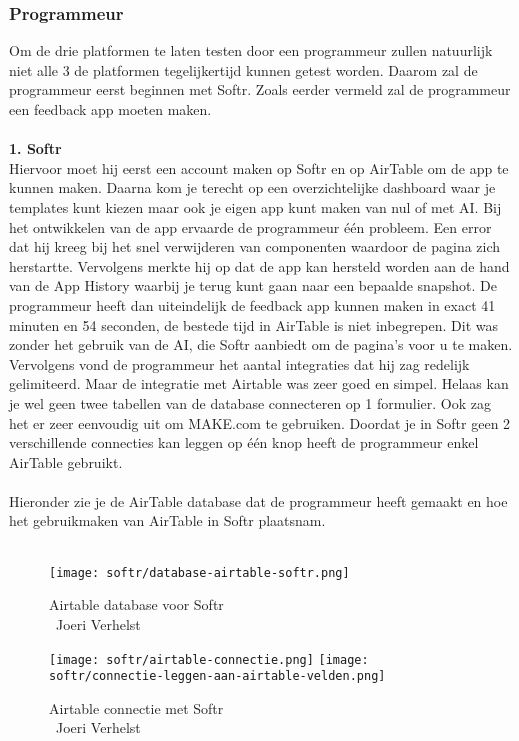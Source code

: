 \subsubsection{Programmeur}%
\label{subsubsec:programmeur}
Om de drie platformen te laten testen door een programmeur zullen natuurlijk niet alle 3 de platformen tegelijkertijd 
kunnen getest worden. Daarom zal de programmeur eerst beginnen met Softr. 
Zoals eerder vermeld zal de programmeur een feedback app moeten maken.
\\
\\
\textbf{1. Softr}
\\
Hiervoor moet hij eerst een account maken op Softr en op AirTable om de app te kunnen maken. 
Daarna kom je terecht op een overzichtelijke dashboard waar je templates kunt kiezen maar 
ook je eigen app kunt maken van nul of met AI. Bij het ontwikkelen van de app ervaarde de programmeur één probleem.
Een error dat hij kreeg bij het snel verwijderen van componenten waardoor de pagina zich herstartte. 
Vervolgens merkte hij op dat de app kan hersteld worden aan de hand van de App History waarbij je terug kunt gaan 
naar een bepaalde snapshot. De programmeur heeft dan uiteindelijk de feedback app 
kunnen maken in exact 41 minuten en 54 seconden, de bestede tijd in AirTable is niet inbegrepen. 
Dit was zonder het gebruik van de AI, die Softr aanbiedt om de pagina’s voor u te maken. Vervolgens vond 
de programmeur het aantal integraties dat hij zag redelijk gelimiteerd. Maar de integratie met Airtable was 
zeer goed en simpel. Helaas kan je wel geen twee tabellen van de database connecteren op 1 formulier. 
Ook zag het er zeer eenvoudig uit om MAKE.com te gebruiken. Doordat je in Softr geen 2 verschillende connecties 
kan leggen op één knop heeft de programmeur enkel AirTable gebruikt.
\\
\\
Hieronder zie je de AirTable database dat de programmeur heeft gemaakt en hoe het gebruikmaken van AirTable in Softr plaatsnam.
\\
\\
\begin{figure}[H]
    \texttt{[image: softr/database-airtable-softr.png]}
    \caption[Airtable database voor Softr]{Airtable database voor Softr\\\textcopyright\ Joeri Verhelst}
    \label{fig:database-airtable-softr}
\end{figure}
\begin{figure}[H]
    \texttt{[image: softr/airtable-connectie.png]}
    \texttt{[image: softr/connectie-leggen-aan-airtable-velden.png]}
    \caption[Airtable connectie met Softr]{Airtable connectie met Softr\\\textcopyright\ Joeri Verhelst}
    \label{fig:database-airtable-softr-connectie}
\end{figure}

